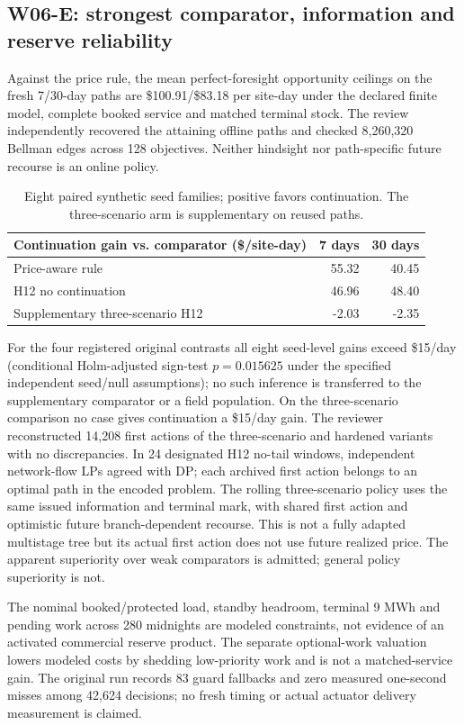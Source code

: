 \documentclass[11pt,letterpaper]{article}
\begin{document}
\subsection{W06-E: strongest comparator, information and reserve reliability}
Against the price rule, the mean perfect-foresight opportunity ceilings on the fresh 7/30-day paths are \$100.91/\$83.18 per site-day under the declared finite model, complete booked service and matched terminal stock. The review independently recovered the attaining offline paths and checked 8,260,320 Bellman edges across 128 objectives. Neither hindsight nor path-specific future recourse is an online policy.
\begin{table}[htbp]\centering\small
\begin{tabular}{lrr}\toprule
Continuation gain vs. comparator (\$/site-day)&7 days&30 days\\\midrule
Price-aware rule &55.32&40.45\\
H12 no continuation &46.96&48.40\\
Supplementary three-scenario H12 &-2.03&-2.35\\\bottomrule
\end{tabular}
\caption{Eight paired synthetic seed families; positive favors continuation. The three-scenario arm is supplementary on reused paths.}
\end{table}
For the four registered original contrasts all eight seed-level gains exceed \$15/day (conditional Holm-adjusted sign-test $p=0.015625$ under the specified independent seed/null assumptions); no such inference is transferred to the supplementary comparator or a field population. On the three-scenario comparison no case gives continuation a \$15/day gain. The reviewer reconstructed 14,208 first actions of the three-scenario and hardened variants with no discrepancies. In 24 designated H12 no-tail windows, independent network-flow LPs agreed with DP; each archived first action belongs to an optimal path in the encoded problem. The rolling three-scenario policy uses the same issued information and terminal mark, with shared first action and optimistic future branch-dependent recourse. This is not a fully adapted multistage tree but its actual first action does not use future realized price. The apparent superiority over weak comparators is admitted; general policy superiority is not.

The nominal booked/protected load, standby headroom, terminal 9 MWh and pending work across 280 midnights are modeled constraints, not evidence of an activated commercial reserve product. The separate optional-work valuation lowers modeled costs by shedding low-priority work and is not a matched-service gain. The original run records 83 guard fallbacks and zero measured one-second misses among 42,624 decisions; no fresh timing or actual actuator delivery measurement is claimed.
\end{document}
